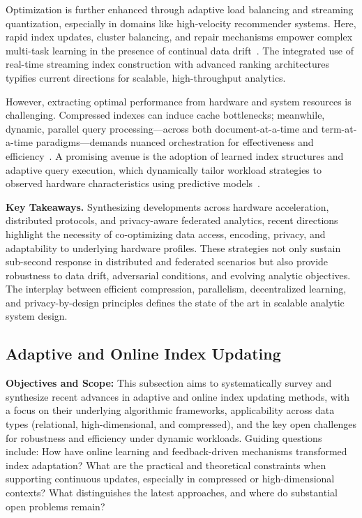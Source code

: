 \documentclass[sigconf]{acmart}
\begin{document}
Optimization is further enhanced through adaptive load balancing and streaming quantization, especially in domains like high-velocity recommender systems. Here, rapid index updates, cluster balancing, and repair mechanisms empower complex multi-task learning in the presence of continual data drift~\cite{ref75}. The integrated use of real-time streaming index construction with advanced ranking architectures typifies current directions for scalable, high-throughput analytics.

However, extracting optimal performance from hardware and system resources is challenging. Compressed indexes can induce cache bottlenecks; meanwhile, dynamic, parallel query processing—across both document-at-a-time and term-at-a-time paradigms—demands nuanced orchestration for effectiveness and efficiency~\cite{ref32,ref94}. A promising avenue is the adoption of learned index structures and adaptive query execution, which dynamically tailor workload strategies to observed hardware characteristics using predictive models~\cite{ref29,ref70,ref97,ref118}.

\textbf{Key Takeaways.} Synthesizing developments across hardware acceleration, distributed protocols, and privacy-aware federated analytics, recent directions highlight the necessity of co-optimizing data access, encoding, privacy, and adaptability to underlying hardware profiles. These strategies not only sustain sub-second response in distributed and federated scenarios but also provide robustness to data drift, adversarial conditions, and evolving analytic objectives. The interplay between efficient compression, parallelism, decentralized learning, and privacy-by-design principles defines the state of the art in scalable analytic system design.

\subsection{Adaptive and Online Index Updating}

\textbf{Objectives and Scope:} This subsection aims to systematically survey and synthesize recent advances in adaptive and online index updating methods, with a focus on their underlying algorithmic frameworks, applicability across data types (relational, high-dimensional, and compressed), and the key open challenges for robustness and efficiency under dynamic workloads. Guiding questions include: How have online learning and feedback-driven mechanisms transformed index adaptation? What are the practical and theoretical constraints when supporting continuous updates, especially in compressed or high-dimensional contexts? What distinguishes the latest approaches, and where do substantial open problems remain?
\end{document}
